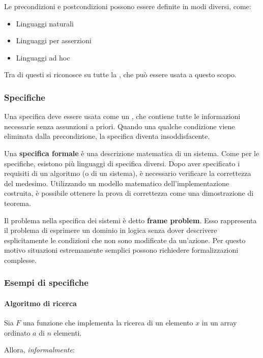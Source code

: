 \documentclass[italian, 10pt]{article}
\begin{document}
Le precondizioni e postcondizioni possono essere definite in modi diversi, come:
\begin{itemize}
  \item Linguaggi naturali
  \item Linguaggi per asserzioni
  \item Linguaggi ad hoc
\end{itemize}

Tra di questi si riconosce su tutte la \FOL, che può essere usata a questo scopo.

\subsubsection{Specifiche}
\label{sec:specifiche}

Una specifica deve essere usata come un , che contiene tutte le informazioni necessarie senza assunzioni a priori.
Quando una qualche condizione viene eliminata dalla precondizione, la specifica diventa insoddisfacente.

\bigskip
Una \textbf{specifica formale} è una descrizione matematica di un sistema.
Come per le specifiche, esistono più linguaggi di specifica diversi.
Dopo aver specificato i requisiti di un algoritmo (o di un sistema), è necessario verificare la correttezza del medesimo.
Utilizzando un modello matematico dell'implementazione costruita, è possibile ottenere la prova di correttezza come una dimostrazione di teorema.

\bigskip
Il problema nella specifica dei sistemi è detto \textbf{frame problem}.
Esso rappresenta il problema di esprimere un dominio in logica senza dover descrivere esplicitamente le condizioni che non sono modificate da un'azione.
Per questo motivo situazioni estremamente semplici possono richiedere formalizzazioni complesse.

\subsubsection{Esempi di specifiche}

\paragraph{Algoritmo di ricerca}

Sia \(F\) una funzione che implementa la ricerca di un elemento \(x\) in un array ordinato \(a\) di \(n\) elementi.

Allora, \textit{informalmente}:
\end{document}
